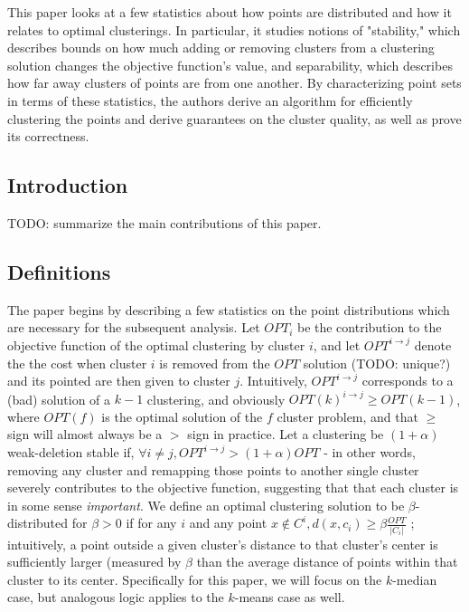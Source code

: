 \documentclass[paper=a4, fontsize=11pt]{scrartcl} %
\numberwithin{equation}{section} %
\numberwithin{figure}{section} %
\numberwithin{table}{section} %
\begin{document}
This paper looks at a few statistics about how points are distributed and how it relates to optimal clusterings.  In particular, it studies notions of "stability," which describes bounds on how much adding or removing clusters from a clustering solution changes the objective function's value, and separability, which describes how far away clusters of points are from one another.  By characterizing point sets in terms of these statistics, the authors derive an algorithm for efficiently clustering the points and derive guarantees on the cluster quality, as well as prove its correctness.

\subsection{Introduction}
TODO: summarize the main contributions of this paper.

\subsection{Definitions}
The paper begins by describing a few statistics on the point distributions which are necessary for the subsequent analysis.  Let $OPT_i$ be the contribution to the objective function of the optimal clustering by cluster $i$, and let $OPT^{i \rightarrow j}$ denote the the cost when cluster $i$ is removed from the $OPT$ solution (TODO: unique?) and its pointed are then given to cluster $j$.  Intuitively, $OPT^{i \rightarrow j}$ corresponds to a (bad) solution of a $k-1$ clustering, and obviously $OPT(k)^{i \rightarrow j} \geq OPT(k-1)$, where $OPT(f)$ is the optimal solution of the $f$ cluster problem, and that $\geq$ sign will almost always be a $>$ sign in practice.  Let a clustering be $(1 + \alpha)$ weak-deletion stable if, $\forall i \neq j, OPT^{i \rightarrow j} > (1 + \alpha)OPT$ - in other words, removing any cluster and remapping those points to another single cluster severely contributes to the objective function, suggesting that that each cluster is in some sense \emph{important}.  We define an optimal clustering solution to be $\beta$-distributed for $\beta > 0$ if for any $i$ and any point $x \notin C^i, d(x, c_i) \geq \beta \frac{OPT}{|C_i|}$ ; intuitively, a point outside a given cluster's distance to that cluster's center is sufficiently larger (measured by $\beta$ than the average distance of points within that cluster to its center.  Specifically for this paper, we will focus on the $k$-median case, but analogous logic applies to the $k$-means case as well.   
\end{document}
